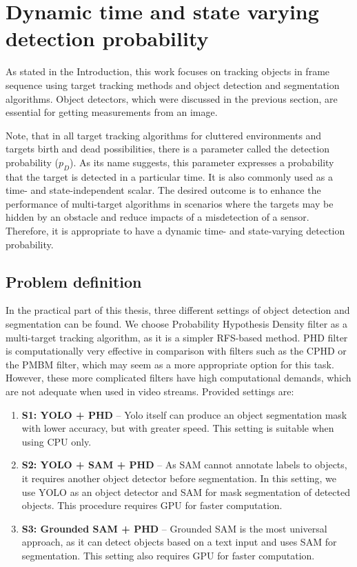 \chapter{Dynamic time and state varying detection probability}
As stated in the Introduction, this work focuses on tracking objects in frame sequence using target tracking methods
and
object detection
and
segmentation algorithms. Object detectors, which were discussed in the previous section, are essential for getting
measurements
from an image.

Note, that in all target tracking algorithms for cluttered environments and targets
birth and dead possibilities, there is a parameter called the detection probability ($p_D$). As its name
suggests, this parameter expresses a probability that the target is detected in a particular time. It is also commonly
used
as a
time- and state-independent scalar. The desired outcome is to enhance the performance of multi-target
algorithms in scenarios where the targets may be hidden by an obstacle and reduce impacts of a misdetection of a sensor.
Therefore, it
is appropriate to have a dynamic time- and state-varying detection probability.
\section{Problem definition}
\label{sec:mphd_problemDef}
In the practical part of this thesis, three different settings of object detection and segmentation can be found.
We choose Probability Hypothesis Density filter as a multi-target tracking algorithm, as it is a simpler
RFS-based method. PHD filter is computationally very effective in comparison with filters such as the CPHD or the
PMBM filter,
which may seem as a more appropriate option for this task. However, these more complicated filters have high
computational demands, which
are not adequate when used in video streams. Provided settings are:
\begin{enumerate}
  \item \textbf{S1: YOLO + PHD} -- Yolo itself can produce an object segmentation mask with lower accuracy, but with
  greater
  speed. This setting is suitable when using CPU only.
  \item \textbf{S2: YOLO + SAM + PHD} -- As SAM cannot annotate labels to objects, it requires another object detector
  before segmentation. In this setting, we use YOLO as an object detector and SAM for mask segmentation of detected
  objects. This procedure requires GPU for faster computation.
  \item \textbf{S3: Grounded SAM + PHD} -- Grounded SAM is the most universal approach, as it can detect objects based
  on a text input and uses SAM for segmentation. This setting also requires GPU for faster computation.
\end{enumerate}



